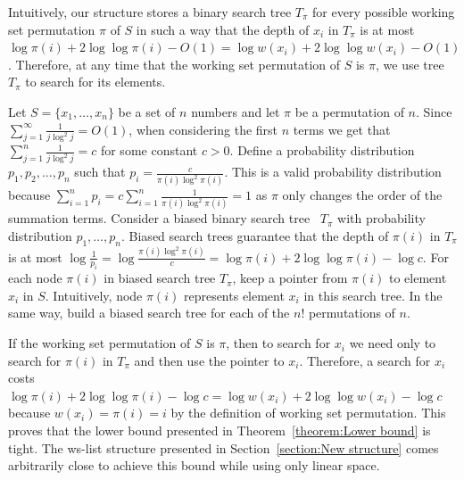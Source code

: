 \documentclass[11pt]{article}       %
\newcommand{\wlist}{ws-list\xspace}
\begin{document}
Intuitively, our structure stores a binary search tree $T_\pi$ for every possible working set permutation $\pi$ of $S$ in such a way that the depth of $x_i$ in $T_\pi$ is at most $\log \pi(i) + 2\log\log \pi(i) - O(1) = \log w(x_i) + 2\log\log w(x_i) - O(1)$. Therefore, at any time that  the working set permutation of $S$ is $\pi$, we use tree $T_\pi$ to search for its elements.


Let $S = \{x_1, \ldots, x_n\}$ be a set of $n$ numbers and let $\pi$ be a permutation of $n$.
Since $\sum_{j=1}^\infty \frac{1}{j\log^{2} j}  = O(1)$, when considering the first $n$ terms we get that $\sum_{j=1}^n \frac{1}{j\log^{2} j} = c$ for some constant $c>0$.
Define a probability distribution $p_1, p_2, \ldots, p_n$ such that $p_i = \frac{c}{\pi(i)\log^{2} \pi(i)}$. This is a valid probability distribution because $\sum_{i=1}^n p_i = c \sum_{i=1}^n \frac{1}{\pi(i)\log^{2} \pi(i)} = 1$ as $\pi$ only changes the order of the summation terms.
Consider a biased binary search tree~\cite{bent1985biased} $T_\pi$ with probability distribution $p_1, \ldots, p_n$.
Biased search trees guarantee that the depth of $\pi(i)$ in $T_\pi$ is at most $\log \frac{1}{p_i} = \log \frac{\pi(i)\log^2 \pi(i)}{c} = \log \pi(i) + 2\log \log \pi(i) - \log c$. For each node $\pi(i)$ in biased search tree $T_\pi$, keep a pointer from $\pi(i)$ to element $x_i$ in $S$. Intuitively, node $\pi(i)$ represents element $x_i$ in this search tree.
In the same way, build a biased search tree for each of the $n!$ permutations of $n$.

If the working set permutation of $S$ is $\pi$, then to search for $x_i$ we need only to search for $\pi(i)$ in $T_\pi$ and then use the pointer to $x_i$.
Therefore, a search for $x_i$ costs $ \log \pi(i) + 2\log \log \pi(i) - \log c = \log w(x_i) + 2\log\log w(x_i) - \log c$ because $w(x_i) = \pi(i) = i$ by the definition of working set permutation.
This proves that the lower bound presented in Theorem~\ref{theorem:Lower bound} is tight. 
The \wlist structure presented in Section~\ref{section:New structure} comes arbitrarily close to achieve this bound while using only linear space.


\end{document}
